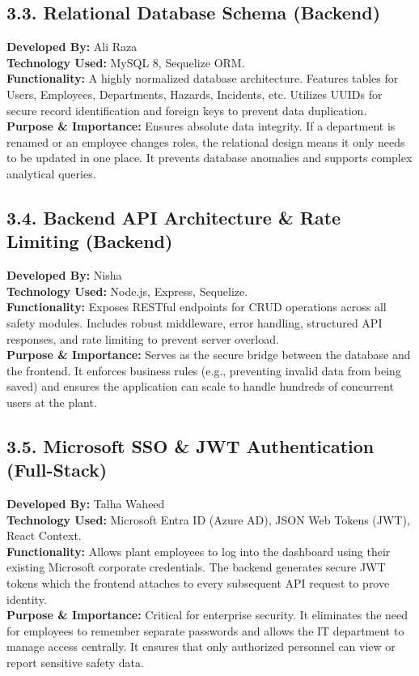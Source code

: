 \documentclass[12pt,a4paper]{article}
\begin{document}
\subsection*{3.3. Relational Database Schema (Backend)}
\textbf{Developed By:} Ali Raza \\
\textbf{Technology Used:} MySQL 8, Sequelize ORM. \\
\textbf{Functionality:} A highly normalized database architecture. Features tables for Users, Employees, Departments, Hazards, Incidents, etc. Utilizes UUIDs for secure record identification and foreign keys to prevent data duplication. \\
\textbf{Purpose \& Importance:} Ensures absolute data integrity. If a department is renamed or an employee changes roles, the relational design means it only needs to be updated in one place. It prevents database anomalies and supports complex analytical queries.

\subsection*{3.4. Backend API Architecture \& Rate Limiting (Backend)}
\textbf{Developed By:} Nisha \\
\textbf{Technology Used:} Node.js, Express, Sequelize. \\
\textbf{Functionality:} Exposes RESTful endpoints for CRUD operations across all safety modules. Includes robust middleware, error handling, structured API responses, and rate limiting to prevent server overload. \\
\textbf{Purpose \& Importance:} Serves as the secure bridge between the database and the frontend. It enforces business rules (e.g., preventing invalid data from being saved) and ensures the application can scale to handle hundreds of concurrent users at the plant.

\subsection*{3.5. Microsoft SSO \& JWT Authentication (Full-Stack)}
\textbf{Developed By:} Talha Waheed \\
\textbf{Technology Used:} Microsoft Entra ID (Azure AD), JSON Web Tokens (JWT), React Context. \\
\textbf{Functionality:} Allows plant employees to log into the dashboard using their existing Microsoft corporate credentials. The backend generates secure JWT tokens which the frontend attaches to every subsequent API request to prove identity. \\
\textbf{Purpose \& Importance:} Critical for enterprise security. It eliminates the need for employees to remember separate passwords and allows the IT department to manage access centrally. It ensures that only authorized personnel can view or report sensitive safety data.
\end{document}
